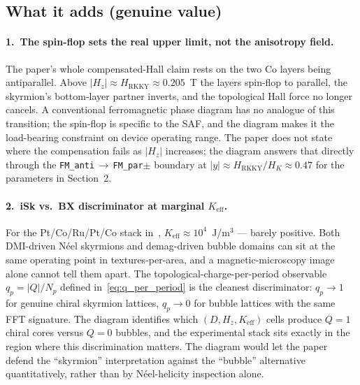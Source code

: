 \documentclass[11pt,a4paper]{article}
\newcommand{\Keff}{K_{\text{eff}}}
\newcommand{\HK}{H_K}
\newcommand{\HRKKY}{H_{\text{RKKY}}}
\begin{document}
\subsection{What it adds (genuine value)}

\paragraph{1.\ The spin-flop sets the real upper limit, not
the anisotropy field.}
The paper's whole compensated-Hall claim rests on the two
Co layers being antiparallel. Above
$|H_z| \approx \HRKKY \approx 0.205$~T the layers
spin-flop to parallel, the skyrmion's bottom-layer partner
inverts, and the topological Hall force no longer cancels.
A conventional ferromagnetic phase diagram has no analogue
of this transition; the spin-flop is specific to the SAF,
and the diagram makes it the load-bearing constraint on
device operating range. The paper does not state where the
compensation fails as $|H_z|$ increases; the diagram
answers that directly through the
\texttt{FM\_anti}\,$\to$\,\texttt{FM\_par$\pm$} boundary at
$|y| \approx \HRKKY/\HK \approx 0.47$ for the parameters
in Section~2.

\paragraph{2.\ iSk vs.\ BX discriminator at marginal
$\Keff$.}
For the Pt/Co/Ru/Pt/Co stack in~\cite{pham2024},
$\Keff \approx 10^4$~J/m$^3$ --- barely positive. Both
DMI-driven N\'{e}el skyrmions and demag-driven bubble
domains can sit at the same operating point in
textures-per-area, and a magnetic-microscopy image alone
cannot tell them apart. The
topological-charge-per-period observable
$q_p = |Q|/N_p$ defined in~\eqref{eq:q_per_period} is the
cleanest discriminator: $q_p \to 1$ for genuine chiral
skyrmion lattices, $q_p \to 0$ for bubble lattices with
the same FFT signature. The diagram identifies which
$(D, H_z, \Keff)$ cells produce $Q = 1$ chiral cores
versus $Q = 0$ bubbles, and the experimental stack sits
exactly in the region where this discrimination matters.
The diagram would let the paper defend the
``skyrmion'' interpretation against the ``bubble''
alternative quantitatively, rather than by N\'{e}el-helicity
inspection alone.
\end{document}
